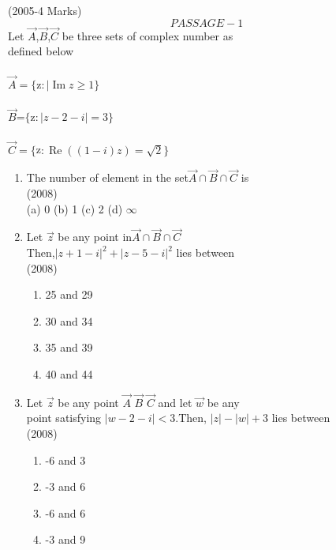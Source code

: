\documentclass[journal]{IEEEtran}
\theoremstyle{remark}
\begin{document}
\begin{enumerate}[start=7]
\hfill (2005-4 Marks) \\
\newpage
$$PASSAGE-1$$
Let $\vec{A}$,$\vec{B}$,$\vec{C}$ be three sets of complex number as\\ 
defined below\\\\
$\vec{A} = \{ $z$ :\mid \operatorname{Im} z \geq 1 \}$\\\\
$\vec{B}$=$\{$z$:|z-2-i|=3\}$\\\\
$\vec{C} = \{$z$ : \operatorname{Re} \left((1-i)z\right) = \sqrt{2} \}$\\
\begin{enumerate}     
\item The number of element in the set$\vec{A} \cap\vec{B} \cap\vec{C} $
is\\ 

\hfill (2008)\\
   (a) 0 \hfill
   (b) 1 \hfill
   (c) 2 \hfill
   (d) $\infty$\\
\item Let $\vec{z}$ be any point in$ \vec{A}\cap\vec{B}\cap\vec{C} $\\
 Then,$|z+1-i|^2+|z-5-i|^2$ lies between\\
 
 \hfill  (2008) \\
\begin{multicols}{2}
    \begin{enumerate}
        \item 25 and 29
        \item 30 and 34
        \item 35 and 39
        \item 40 and 44
    \end{enumerate}
\end{multicols}
\item  Let $\vec{z}$ be any point $\vec{A}$ $\vec{B}$ $\vec{C}$ and let $\vec{w}$ be any\\
point satisfying $|w-2-i|<3$.Then, $|z|-|w|+3$ lies between\\
   
\hfill (2008) \\
 \begin{multicols}{2}
  \begin{enumerate}
    \item -6 and 3
    \item -3 and 6 
    \item -6 and 6
    \item -3 and 9
  \end{enumerate}
 \end{multicols}

\end{enumerate}
\end{enumerate}
\end{document}
